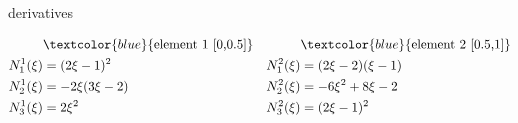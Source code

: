\documentclass{beamer}
\begin{document}
\begin{frame}[allowframebreaks]
\begin{minipage}[b]{0.48\linewidth}
    \centering \footnotesize{derivatives}
  \end{minipage}
  \begin{equation}\nonumber
    \begin{aligned}
       & \textcolor{blue}{\text{element 1 [0,0.5]}}  & & \textcolor{blue}{\text{element 2 [0.5,1]}} \\
      N_1^1(\xi) &=  (2 \xi -1)^2 & N_1^2(\xi) &= (2\xi-2)(\xi-1)  \\
      N_2^1(\xi) &= -2\xi(3\xi-2) &N_2^2(\xi) &= -6\xi^2 + 8\xi -2 \\
      N_3^1(\xi) &=  2\xi^2       & N_3^2(\xi) &= (2\xi -1)^2 \\
    \end{aligned}
  \end{equation}


  \newpage



\end{frame}

\end{document}
